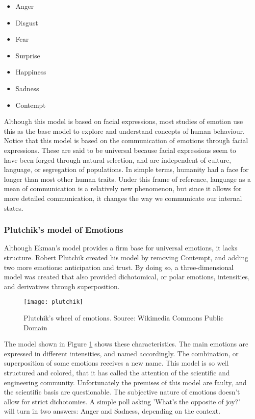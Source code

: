 \begin{itemize}
  \item Anger
  \item Disgust
  \item Fear
  \item Surprise
  \item Happiness
  \item Sadness
  \item Contempt
\end{itemize}

Although this model is based on facial expressions, most studies of emotion use this as the base model to explore and understand concepts of human behaviour. Notice that this model is based on the communication of emotions through facial expressions. These are said to be universal because facial expressions seem to have been forged through natural selection, and are independent of culture, language, or segregation of populations. In simple terms, humanity had a face for longer than most other human traits. Under this frame of reference, language as a mean of communication is a relatively new phenomenon, but since it allows for more detailed communication, it changes the way we communicate our internal states.

\subsubsection{Plutchik's model of Emotions}\label{subs:Plutchik's model of Emotions}
Although Ekman's model provides a firm base for universal emotions, it lacks structure. Robert Plutchik created his model by removing Contempt, and adding two more emotions: anticipation and trust. By doing so, a three-dimensional model was created that also provided dichotomical, or polar emotions, intensities, and derivatives through superposition.

\begin{figure}[H]
  \texttt{[image: plutchik]}
  \centering
  \caption{Plutchik's wheel of emotions. Source: Wikimedia Commons Public Domain}\label{fig:plutchik}
\end{figure}

The model shown in Figure \ref{fig:plutchik} shows these characteristics. The main emotions are expressed in different intensities, and named accordingly. The combination, or superposition of some emotions receives a new name. This model is so well structured and colored, that it has called the attention of the scientific and engineering community. Unfortunately the premises of this model are faulty, and the scientific basis are questionable. The subjective nature of emotions doesn't allow for strict dichotomies. A simple poll asking 'What's the opposite of joy?' will turn in two answers: Anger and Sadness, depending on the context.


